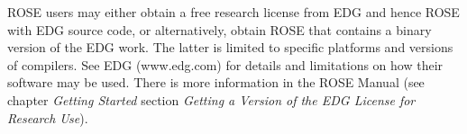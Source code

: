    ROSE users may either obtain a free research license from EDG and hence ROSE with EDG source code,
or alternatively, obtain ROSE that contains a binary version of the EDG work.
The latter is limited to specific platforms and versions of compilers. See EDG (www.edg.com) for details 
and limitations on how their software may be used. There is more information in the 
ROSE Manual (see chapter {\em Getting Started}
section {\em Getting a Version of the EDG License for Research Use}).


